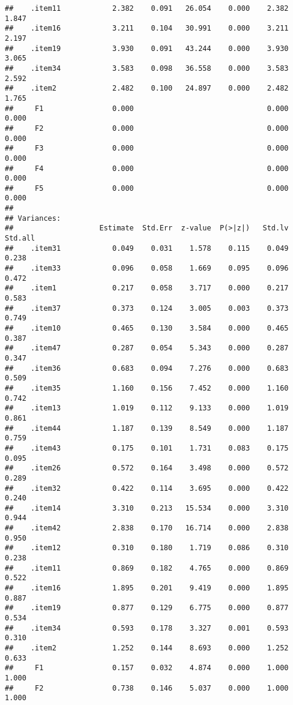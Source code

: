\documentclass[
  english,
  man]{apa6}
\begin{document}
\begin{verbatim}
##    .item11            2.382    0.091   26.054    0.000    2.382    1.847
##    .item16            3.211    0.104   30.991    0.000    3.211    2.197
##    .item19            3.930    0.091   43.244    0.000    3.930    3.065
##    .item34            3.583    0.098   36.558    0.000    3.583    2.592
##    .item2             2.482    0.100   24.897    0.000    2.482    1.765
##     F1                0.000                               0.000    0.000
##     F2                0.000                               0.000    0.000
##     F3                0.000                               0.000    0.000
##     F4                0.000                               0.000    0.000
##     F5                0.000                               0.000    0.000
## 
## Variances:
##                    Estimate  Std.Err  z-value  P(>|z|)   Std.lv  Std.all
##    .item31            0.049    0.031    1.578    0.115    0.049    0.238
##    .item33            0.096    0.058    1.669    0.095    0.096    0.472
##    .item1             0.217    0.058    3.717    0.000    0.217    0.583
##    .item37            0.373    0.124    3.005    0.003    0.373    0.749
##    .item10            0.465    0.130    3.584    0.000    0.465    0.387
##    .item47            0.287    0.054    5.343    0.000    0.287    0.347
##    .item36            0.683    0.094    7.276    0.000    0.683    0.509
##    .item35            1.160    0.156    7.452    0.000    1.160    0.742
##    .item13            1.019    0.112    9.133    0.000    1.019    0.861
##    .item44            1.187    0.139    8.549    0.000    1.187    0.759
##    .item43            0.175    0.101    1.731    0.083    0.175    0.095
##    .item26            0.572    0.164    3.498    0.000    0.572    0.289
##    .item32            0.422    0.114    3.695    0.000    0.422    0.240
##    .item14            3.310    0.213   15.534    0.000    3.310    0.944
##    .item42            2.838    0.170   16.714    0.000    2.838    0.950
##    .item12            0.310    0.180    1.719    0.086    0.310    0.238
##    .item11            0.869    0.182    4.765    0.000    0.869    0.522
##    .item16            1.895    0.201    9.419    0.000    1.895    0.887
##    .item19            0.877    0.129    6.775    0.000    0.877    0.534
##    .item34            0.593    0.178    3.327    0.001    0.593    0.310
##    .item2             1.252    0.144    8.693    0.000    1.252    0.633
##     F1                0.157    0.032    4.874    0.000    1.000    1.000
##     F2                0.738    0.146    5.037    0.000    1.000    1.000

\end{verbatim}
\end{document}
